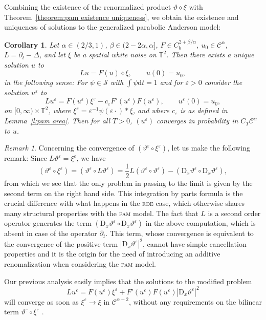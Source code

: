 \documentclass[11pt,a4paper]{article}
\newcommand{\mathD}{\mathrm{D}}
\newcommand{\mathd}{\mathrm{d}}
\newtheorem{corollary}[theorem]{Corollary}
\theoremstyle{remark}
\newtheorem{remark}[theorem]{Remark}
\newcommand{\CC}{\ensuremath{\mathscr{C}}}
\newcommand{\CS}{\ensuremath{\mathscr{S}}}
\begin{document}
Combining the existence of the renormalized product $\vartheta \diamond \xi$ with Theorem~\ref{theorem:pam existence uniqueness}, we obtain the existence and uniqueness of solutions to the generalized parabolic Anderson model:

\begin{corollary}
  Let $\alpha \in ( 2/3, 1)$, $\beta\in (2-2\alpha,\alpha]$, $F \in C^{2+\beta/\alpha}_b$, $u_0 \in \CC^\alpha$, $L = \partial_t-\Delta$, and let $\xi$ be a spatial white noise on $\mathbb{T}^2$. Then there exists a unique solution $u$ to
  \[
     L u = F(u)\diamond \xi, \qquad u(0) = u_0,
  \]
  in the following sense: For $\psi \in \CS$ with $\int \psi \mathd t=1$ and for $\varepsilon > 0$ consider the solution $u^\varepsilon$ to
  \[
     L u^{\varepsilon} =F ( u^{\varepsilon} ) \xi^{\varepsilon} -c_{\varepsilon} F' ( u^{\varepsilon} ) F ( u^{\varepsilon} ) , \hspace{2em} u^{\varepsilon} ( 0 ) =u_{0},
  \]
  on $[0, \infty)\times\mathbb{T}^2$, where $\xi^\varepsilon = \varepsilon^{-1} \psi(\varepsilon \cdot) \ast \xi$, and where $c_\varepsilon$ is as defined in Lemma~\ref{l:pam area}. Then for all $T>0$, $(u^\varepsilon)$ converges in probability in $C_T \CC^\alpha$ to $u$.
\end{corollary}




\begin{remark}
Concerning the convergence of $( \vartheta^{\varepsilon} \circ
\xi^{\varepsilon} )$, let us make the following remark: Since $L  \vartheta^{\varepsilon} = \xi^{\varepsilon}$,
we have
\[ ( \vartheta^{\varepsilon} \circ \xi^{\varepsilon} ) = (
   \vartheta^{\varepsilon} \circ L  \vartheta^{\varepsilon} ) = \frac{1}{2} L 
   ( \vartheta^{\varepsilon} \circ   \vartheta^{\varepsilon} ) - (
   \mathD_{x} \vartheta^{\varepsilon} \circ \mathD_{x}  
   \vartheta^{\varepsilon} ),
\]
from which we see that the only problem in passing to the limit is given by
the second term on the right hand side. This integration by parts formula is the crucial difference with what happens in the \textsc{rde} case, which otherwise shares many structural properties with the \textsc{pam} model. The fact that $L$ is a second order operator generates the term $(\mathD_{x} \vartheta^{\varepsilon} \circ \mathD_{x}  \vartheta^{\varepsilon} )$ in the above computation, which is absent in case of the operator $\partial_t$. This term, whose convergence is equivalent to the convergence of the positive term $|\mathD_x \vartheta^\varepsilon|^2$, cannot have simple cancellation properties and it is the origin for the need of introducing an additive renomalization when considering the \textsc{pam} model.

Our previous analysis easily implies  that the solutions to the modified
problem
\[
   L u^{\varepsilon} =F ( u^{\varepsilon} ) \xi^{\varepsilon} + F'( u^{\varepsilon} ) F (u^{\varepsilon} ) | \mathD_{x} \vartheta^{\varepsilon}  |^2
\]
will converge as soon as $\xi^{\varepsilon} \rightarrow \xi$ in $\CC^{\alpha
-2}$, without any requirements on the bilinear term $\vartheta^{\varepsilon} \circ
\xi^{\varepsilon}$ . 

\end{remark}
\end{document}

